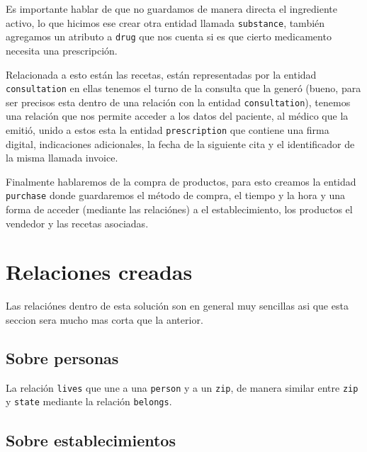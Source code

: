 \documentclass[12pt, fleqn]{report}                             %
\theoremstyle{break}                                            %
\begin{document}
          Es importante hablar de que no guardamos de manera directa el ingrediente activo, lo que hicimos ese
          crear otra entidad llamada \texttt{substance}, también agregamos un atributo a \texttt{drug}
          que nos cuenta si es que cierto medicamento necesita una prescripción.

          Relacionada a esto están las recetas, están representadas por la entidad \texttt{consultation}
          en ellas tenemos el turno de la consulta que la generó (bueno, para ser precisos esta dentro de una
          relación con la entidad \texttt{consultation}), tenemos una relación que nos permite acceder a los
          datos del paciente, al médico que la emitió, unido a estos esta la entidad \texttt{prescription} 
          que contiene una firma digital, indicaciones adicionales, la fecha de la siguiente cita
          y el identificador de la misma llamada invoice.

          Finalmente hablaremos de la compra de productos, para esto creamos la entidad 
          \texttt{purchase} donde guardaremos el método de compra, el tiempo y la hora 
          y una forma de acceder (mediante las relaciónes) a el establecimiento, los productos 
          el vendedor y las recetas asociadas.


      \section{Relaciones creadas}  

        Las relaciónes dentro de esta solución son en general muy sencillas asi que esta seccion sera mucho mas corta
        que la anterior.

        \subsection{Sobre personas}
            La relación \texttt{lives} que une a una \texttt{person} y a un \texttt{zip}, de manera similar
            entre \texttt{zip} y \texttt{state} mediante la relación \texttt{belongs}.

        \subsection{Sobre establecimientos}
\end{document}
